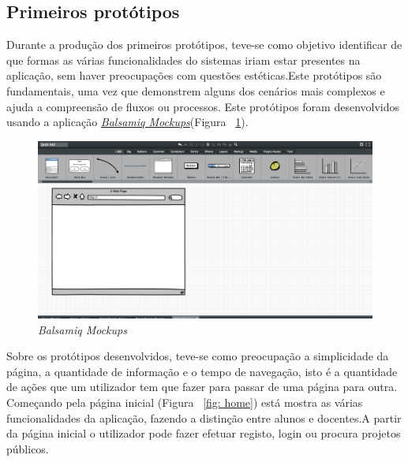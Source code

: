  \subsection{Primeiros protótipos}


Durante a produção dos primeiros protótipos, teve-se como objetivo identificar de que formas as várias funcionalidades do sistemas iriam estar presentes na aplicação, sem haver preocupações com questões estéticas.Este protótipos são fundamentais, uma vez que demonstrem alguns dos cenários mais complexos e ajuda a compreensão de fluxos ou processos.
Este protótipos foram desenvolvidos usando a aplicação \href{http://balsamiq.com/products/mockups/}{\emph{Balsamiq Mockups}}(Figura ~\ref{fig: balsamiq}).\\

 \begin{figure}[htbp]
        \centering
        \includegraphics[width=1\textwidth]{images/prototipos/mockups/balsamiq.png}
         \caption{\emph{Balsamiq Mockups}}
         \label{fig: balsamiq}
\end{figure}

Sobre os protótipos desenvolvidos, teve-se como preocupação a simplicidade da página, a quantidade de informação e o tempo de navegação, isto é a quantidade de ações que um utilizador tem que fazer para passar de uma página para outra.\\
Começando pela página inicial (Figura ~\ref{fig: home}) está mostra as várias funcionalidades da aplicação, fazendo a distinção entre alunos e docentes.A partir da página inicial o utilizador pode fazer efetuar registo, login ou procura projetos públicos. \\


